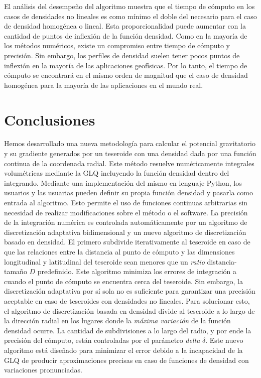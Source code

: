 El análisis del desempeño del algoritmo muestra que el tiempo de cómputo
en los casos de densidades no lineales es como mínimo el doble del
necesario para el caso de densidad homogénea o lineal.
Esta proporcionalidad puede aumentar con la cantidad de puntos de inflexión de
la función densidad.
Como en la mayoría de los métodos numéricos, existe un compromiso entre tiempo
de cómputo y precisión.
Sin embargo, los perfiles de densidad suelen tener pocos puntos de inflexión en
la mayoría de las aplicaciones geofísicas.
Por lo tanto, el tiempo de cómputo se encontrará en el mismo orden de magnitud
que el caso de densidad homogénea para la mayoría de las aplicaciones en el
mundo real.


\section{Conclusiones}

Hemos desarrollado una nueva metodología para calcular el potencial
gravitatorio y su gradiente generados por un teseroide con una densidad dada
por una función continua de la coordenada radial.
Este método resuelve numéricamente integrales volumétricas mediante la
\ac{GLQ} incluyendo la función densidad dentro del integrando.
Mediante una implementación del mismo en lenguaje Python, los usuarios
y las usuarias pueden definir su propia función densidad y pasarla como
entrada al algoritmo.
Esto permite el uso de funciones continuas arbitrarias sin necesidad de
realizar modificaciones sobre el método o el software.
La precisión de la integración numérica es controlada automáticamente por un
algoritmo de discretización adaptativa bidimensional y un nuevo algoritmo de
discretización basado en densidad.
El primero subdivide iterativamente al teseroide en caso de que las relaciones
entre la distancia al punto de cómputo y las dimensiones longitudinal
y latitudinal del teseroide sean menores que un \emph{ratio} distancia-tamaño
$D$ predefinido.
Este algoritmo minimiza los errores de integración a cuando el punto de
cómputo se encuentra cerca del teseroide.
Sin embargo, la discretización adaptativa por sí sola no es suficiente para
garantizar una precisión aceptable en caso de teseroides con densidades no
lineales.
Para solucionar esto, el algoritmo de discretización basada en densidad divide
al teseroide a lo largo de la dirección radial en los lugares donde la
\emph{máxima variación} de la función densidad ocurre.
La cantidad de subdivisiones a lo largo del radio, y por ende la precisión del
cómputo, están controladas por el parámetro \emph{delta} $\delta$.
Este nuevo algoritmo está diseñado para minimizar el error debido a la
incapacidad de la \ac{GLQ} de producir aproximaciones precisas en caso de
funciones de densidad con variaciones pronunciadas.

